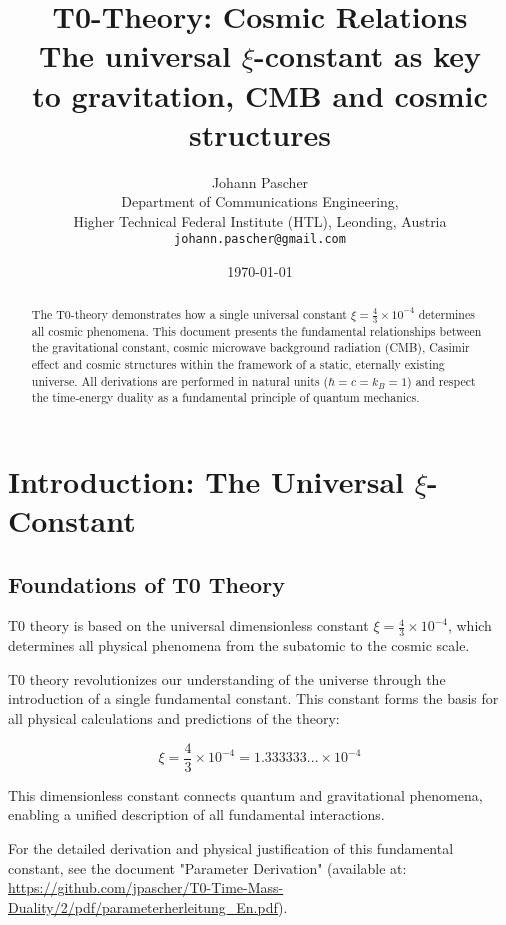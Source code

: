 \documentclass[12pt,a4paper]{article}
\title{\Huge\textbf{T0-Theory: Cosmic Relations}\\
	\Large The universal $\xi$-constant as key \\
	to gravitation, CMB and cosmic structures}
\author{\Large Johann Pascher\\
	Department of Communications Engineering,\\
	Higher Technical Federal Institute (HTL), Leonding, Austria\\
	\texttt{johann.pascher@gmail.com}}
\date{\today}
\begin{document}
	
	\maketitle
	
	\begin{abstract}
		The T0-theory demonstrates how a single universal constant $\xi = \frac{4}{3} \times 10^{-4}$ determines all cosmic phenomena. This document presents the fundamental relationships between the gravitational constant, cosmic microwave background radiation (CMB), Casimir effect and cosmic structures within the framework of a static, eternally existing universe. All derivations are performed in natural units ($\hbar = c = k_B = 1$) and respect the time-energy duality as a fundamental principle of quantum mechanics.
	\end{abstract}
	
	\tableofcontents
	\newpage
	
	\section{Introduction: The Universal $\xi$-Constant}
	
\subsection{Foundations of T0 Theory}

\begin{important}
	T0 theory is based on the universal dimensionless constant $\xi = \frac{4}{3} \times 10^{-4}$, which determines all physical phenomena from the subatomic to the cosmic scale.
\end{important}

T0 theory revolutionizes our understanding of the universe through the introduction of a single fundamental constant. This constant forms the basis for all physical calculations and predictions of the theory:

\begin{equation}
	\xi = \frac{4}{3} \times 10^{-4} = 1.333333... \times 10^{-4}
\end{equation}

This dimensionless constant connects quantum and gravitational phenomena, enabling a unified description of all fundamental interactions.

\begin{tcolorbox}[colback=yellow!10!white,colframe=yellow!50!black,title=Note on Derivation]
	For the detailed derivation and physical justification of this fundamental constant, see the document "Parameter Derivation" (available at: \url{https://github.com/jpascher/T0-Time-Mass-Duality/2/pdf/parameterherleitung_En.pdf}).
\end{tcolorbox}
	
\end{document}
